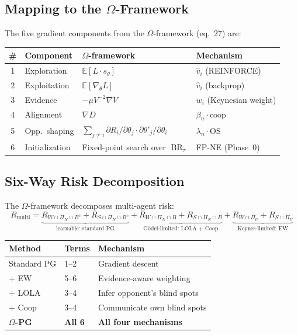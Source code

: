 \documentclass[11pt,a4paper]{article}
\DeclareMathOperator{\BR}{BR}
\newcommand{\E}{\mathbb{E}}
\begin{document}
\subsection{Mapping to the $\Omega$-Framework}

The five gradient components from the $\Omega$-framework (eq.~27) are:

\begin{center}
\begin{tabular}{clll}
\toprule
\textbf{\#} & \textbf{Component} & \textbf{$\Omega$-framework} & \textbf{Mechanism} \\
\midrule
1 & Exploration    & $\E[L \cdot s_\theta]$   & $\hat{v}_i$ (REINFORCE) \\
2 & Exploitation   & $\E[\nabla_\theta L]$    & $\hat{v}_i$ (backprop)  \\
3 & Evidence       & $-\mu V^{-2}\nabla V$    & $w_i$ (Keynesian weight) \\
4 & Alignment      & $\nabla D$                & $\beta_n \cdot \text{coop}$ \\
5 & Opp.\ shaping  & $\sum_{j \neq i} \partial R_i/\partial \theta_j \cdot \partial \theta'_j/\partial \theta_i$ & $\lambda_n \cdot \text{OS}$ \\
6 & Initialization & Fixed-point search over $\BR_\tau$ & FP-NE (Phase~0) \\
\bottomrule
\end{tabular}
\end{center}

\subsection{Six-Way Risk Decomposition}

The $\Omega$-framework decomposes multi-agent risk:
\begin{equation}
    R_{\text{multi}} =
    \underbrace{R_{W \cap \Pi_N \cap B^c} + R_{S \cap \Pi_N \cap B^c}}_{\text{learnable: standard PG}}
    + \underbrace{R_{W \cap \Pi_N \cap B} + R_{S \cap \Pi_N \cap B}}_{\text{G\"odel-limited: LOLA + Coop}}
    + \underbrace{R_{W \cap \Pi_U} + R_{S \cap \Pi_U}}_{\text{Keynes-limited: EW}}
\end{equation}

\begin{center}
\begin{tabular}{lll}
\toprule
\textbf{Method} & \textbf{Terms} & \textbf{Mechanism} \\
\midrule
Standard PG     & 1--2 & Gradient descent \\
+ EW            & 5--6 & Evidence-aware weighting \\
+ LOLA          & 3--4 & Infer opponent's blind spots \\
+ Coop          & 3--4 & Communicate own blind spots \\
\textbf{$\Omega$-PG} & \textbf{All 6} & \textbf{All four mechanisms} \\
\bottomrule
\end{tabular}
\end{center}
\end{document}
